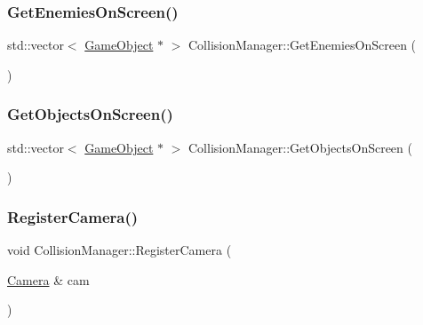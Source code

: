 \hypertarget{class_collision_manager_a9edffbdcca1e34b3fb326ab8addec480}{}\label{class_collision_manager_a9edffbdcca1e34b3fb326ab8addec480} 
\subsubsection{\texorpdfstring{Get\+Enemies\+On\+Screen()}{GetEnemiesOnScreen()}}
{\footnotesize\ttfamily std\+::vector$<$ \hyperlink{class_game_object}{Game\+Object} $\ast$ $>$ Collision\+Manager\+::\+Get\+Enemies\+On\+Screen (\begin{DoxyParamCaption}{ }\end{DoxyParamCaption})\hspace{0.3cm}{\ttfamily [static]}}

\hypertarget{class_collision_manager_aae72acb1f514ba8ef4a3b7e5e9a82291}{}\label{class_collision_manager_aae72acb1f514ba8ef4a3b7e5e9a82291} 
\subsubsection{\texorpdfstring{Get\+Objects\+On\+Screen()}{GetObjectsOnScreen()}}
{\footnotesize\ttfamily std\+::vector$<$ \hyperlink{class_game_object}{Game\+Object} $\ast$ $>$ Collision\+Manager\+::\+Get\+Objects\+On\+Screen (\begin{DoxyParamCaption}{ }\end{DoxyParamCaption})\hspace{0.3cm}{\ttfamily [static]}}

\hypertarget{class_collision_manager_ad0c0a951de17cc2fc6ffceffd56784dd}{}\label{class_collision_manager_ad0c0a951de17cc2fc6ffceffd56784dd} 
\subsubsection{\texorpdfstring{Register\+Camera()}{RegisterCamera()}}
{\footnotesize\ttfamily void Collision\+Manager\+::\+Register\+Camera (\begin{DoxyParamCaption}\item[{\hyperlink{class_camera}{Camera} \&}]{cam }\end{DoxyParamCaption})\hspace{0.3cm}{\ttfamily [static]}}

